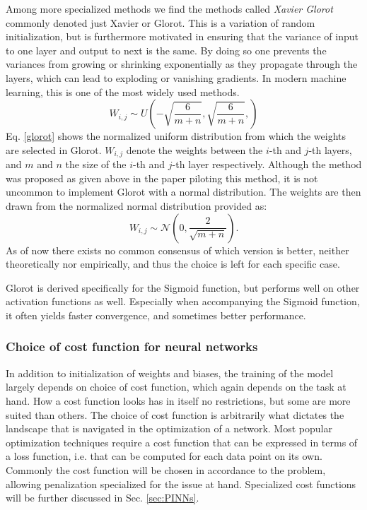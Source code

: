 
Among more specialized methods we find the methods called \textit{Xavier Glorot} \cite{Glorot} commonly denoted just Xavier or Glorot. This is a variation of random initialization, but is furthermore motivated in ensuring that the variance of input to one layer and output to next is the same. By doing so one prevents the variances from growing or shrinking exponentially as they propagate through the layers, which can lead to exploding or vanishing gradients. In modern machine learning, this is one of the most widely used methods.
\begin{equation}\label{glorot}
    W_{i,j} \sim U\left(-\sqrt{\frac{6}{m+n}},{\sqrt{\frac{6}{m+n}}},\right)
\end{equation}
Eq. \ref{glorot} shows the normalized uniform distribution from which the weights are selected in Glorot. $W_{i,j}$ denote the weights between the $i$-th and $j$-th layers, and $m$ and $n$ the size of the $i$-th and $j$-th layer respectively. Although the method was proposed as given above in the paper piloting this method, it is not uncommon to implement Glorot with a normal distribution. The weights are then drawn from the normalized normal distribution provided as:
\begin{equation}
    W_{i,j} \sim \mathcal{N}\left(0, \frac{2}{\sqrt{m+n}}\right).
\end{equation}
As of now there exists no common consensus of which version is better, neither theoretically nor empirically, and thus the choice is left for each specific case.

Glorot is derived specifically for the Sigmoid function, but performs well on other activation functions as well. Especially when accompanying the Sigmoid function, it often yields faster convergence, and sometimes better performance.

\subsubsection{Choice of cost function for neural networks}
In addition to initialization of weights and biases, the training of the model largely depends on choice of cost function, which again depends on the task at hand. How a cost function looks has in itself no restrictions, but some are more suited than others.
The choice of cost function is arbitrarily what dictates the landscape that is navigated in the optimization of a network. Most popular optimization techniques require a cost function that can be expressed in terms of a loss function, i.e. that can be computed for each data point on its own. Commonly the cost function will be chosen in accordance to the problem, allowing penalization specialized for the issue at hand. Specialized cost functions will be further discussed in Sec. \ref{sec:PINNs}.

